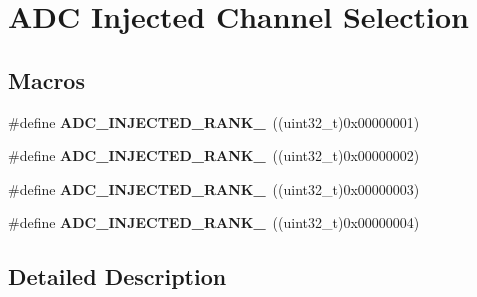 \hypertarget{group___a_d_c_ex__injected__channel__selection}{}\section{A\+DC Injected Channel Selection}
\label{group___a_d_c_ex__injected__channel__selection}
\subsection*{Macros}
\begin{DoxyCompactItemize}
\item 
\#define {\bfseries A\+D\+C\+\_\+\+I\+N\+J\+E\+C\+T\+E\+D\+\_\+\+R\+A\+N\+K\+\_}~((uint32\+\_\+t)0x00000001)\hypertarget{group___a_d_c_ex__injected__channel__selection_gabe6252325fda6b22c794ea7b0e974ee3}{}\label{group___a_d_c_ex__injected__channel__selection_gabe6252325fda6b22c794ea7b0e974ee3}

\item 
\#define {\bfseries A\+D\+C\+\_\+\+I\+N\+J\+E\+C\+T\+E\+D\+\_\+\+R\+A\+N\+K\+\_}~((uint32\+\_\+t)0x00000002)\hypertarget{group___a_d_c_ex__injected__channel__selection_gaf065faf92e099a1667694233384d187e}{}\label{group___a_d_c_ex__injected__channel__selection_gaf065faf92e099a1667694233384d187e}

\item 
\#define {\bfseries A\+D\+C\+\_\+\+I\+N\+J\+E\+C\+T\+E\+D\+\_\+\+R\+A\+N\+K\+\_}~((uint32\+\_\+t)0x00000003)\hypertarget{group___a_d_c_ex__injected__channel__selection_ga5fa8c3014caccae280220fd3df5d7f23}{}\label{group___a_d_c_ex__injected__channel__selection_ga5fa8c3014caccae280220fd3df5d7f23}

\item 
\#define {\bfseries A\+D\+C\+\_\+\+I\+N\+J\+E\+C\+T\+E\+D\+\_\+\+R\+A\+N\+K\+\_}~((uint32\+\_\+t)0x00000004)\hypertarget{group___a_d_c_ex__injected__channel__selection_gaffe7c5042c696b39ef23fba9af5a88b9}{}\label{group___a_d_c_ex__injected__channel__selection_gaffe7c5042c696b39ef23fba9af5a88b9}

\end{DoxyCompactItemize}


\subsection{Detailed Description}
